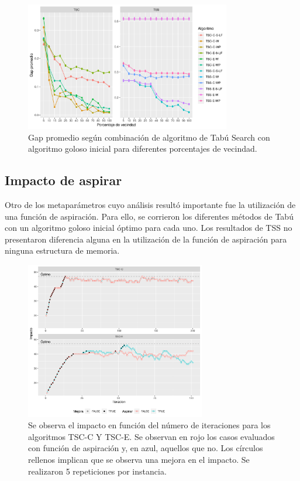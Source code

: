 \begin{figure}[H]
    \centering
    \includegraphics[width=0.8\textwidth]{plots/porcentaje_vecindad.png}
    \caption{{Gap promedio según combinación de algoritmo de Tabú Search con algoritmo goloso inicial para diferentes porcentajes de vecindad.}}
    \label{plot:porcentaje vecindad}
\end{figure}

\subsection{Impacto de aspirar}

Otro de los metaparámetros cuyo análisis resultó importante fue la utilización de una función de aspiración. Para ello, se corrieron los diferentes métodos de Tabú con un algoritmo goloso inicial óptimo para cada uno. Los resultados de TSS no presentaron diferencia alguna en la utilización de la función de aspiración para ninguna estructura de memoria.

\begin{figure}[H]
    \centering
    \includegraphics[width=0.7\textwidth]{plots/impacto_tiempo.png}
    \caption{Se observa el impacto en función del número de iteraciones para los algoritmos TSC-C Y TSC-E. Se observan en rojo los casos evaluados con función de aspiración y, en azul, aquellos que no. Los círculos rellenos implican que se observa una mejora en el impacto. Se realizaron 5 repeticiones por instancia.}
    \label{plot:impacto vs iteracion}
\end{figure}

